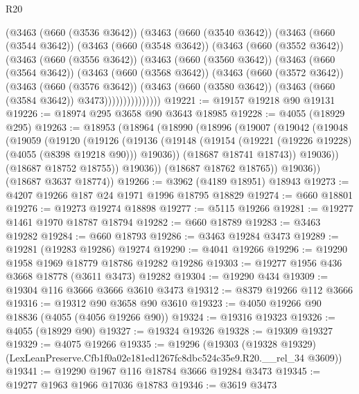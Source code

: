 \begin{lexlean}{R20}
\begin{coremodule}
        (@3463
          (@660 (@3536 @3642))
          (@3463
            (@660 (@3540 @3642))
            (@3463
              (@660 (@3544 @3642))
              (@3463
                (@660 (@3548 @3642))
                (@3463
                  (@660 (@3552 @3642))
                  (@3463
                    (@660 (@3556 @3642))
                    (@3463
                      (@660 (@3560 @3642))
                      (@3463
                        (@660 (@3564 @3642))
                        (@3463
                          (@660 (@3568 @3642))
                          (@3463
                            (@660 (@3572 @3642))
                            (@3463
                              (@660 (@3576 @3642))
                              (@3463
                                (@660 (@3580 @3642))
                                (@3463 (@660 (@3584 @3642)) @3473)))))))))))))))
@19221 := @19157 @19218 @90 @19131
@19226 := @18974 @295 @3658 @90 @3643 @18985
@19228 := @4055 (@18929 @295)
@19263 := @18953
    (@18964
      (@18990
        (@18996
          (@19007
            (@19042
              (@19048
                (@19059
                  (@19120
                    (@19126
                      (@19136
                        (@19148 (@19154 (@19221 (@19226 @19228) (@4055 (@8398 @19218 @90))) @19036))
                        (@18687 @18741 @18743))
                      @19036))
                  (@18687 @18752 @18755))
                @19036))
            (@18687 @18762 @18765))
          @19036))
      (@18687 @3637 @18774))
@19266 := @3962 (@4189 @18951) @18943
@19273 := @4207 @19266 @187 @24 @1971 @1996 @18795 @18829
@19274 := @660 @18801
@19276 := @19273 @19274 @18898
@19277 := @5115 @19266
@19281 := @19277 @1461 @1970 @18787 @18794
@19282 := @660 @18789
@19283 := @3463 @19282
@19284 := @660 @18793
@19286 := @3463 @19284 @3473
@19289 := @19281 (@19283 @19286) @19274
@19290 := @4041 @19266
@19296 := @19290 @1958 @1969 @18779 @18786 @19282 @19286
@19303 := @19277 @1956 @436 @3668 @18778 (@3611 @3473) @19282
@19304 := @19290 @434
@19309 := @19304 @116 @3666 @3666 @3610 @3473
@19312 := @8379 @19266 @112 @3666
@19316 := @19312 @90 @3658 @90 @3610
@19323 := @4050 @19266 @90 @18836 (@4055 (@4056 @19266 @90))
@19324 := @19316 @19323
@19326 := @4055 (@18929 @90)
@19327 := @19324 @19326
@19328 := @19309 @19327
@19329 := @4075 @19266
@19335 := @19296
    (@19303 (@19328 @19329) (LexLeanPreserve.Cfb1f0a02e181ed1267fc8dbc524c35e9.R20.__rel_34 @3609))
@19341 := @19290 @1967 @116 @18784 @3666 @19284 @3473
@19345 := @19277 @1963 @1966 @17036 @18783
@19346 := @3619 @3473

\end{coremodule}
\end{lexlean}
